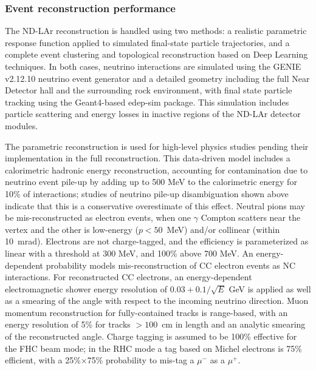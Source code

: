 \subsubsection{Event reconstruction performance}

The ND-LAr reconstruction is handled using two methods: a realistic parametric response function applied to simulated final-state particle trajectories, and a complete event clustering and topological reconstruction based on Deep Learning techniques. In both cases, neutrino interactions are simulated using the GENIE v2.12.10 neutrino event generator and a detailed geometry including the full Near Detector hall and the surrounding rock environment, with final state particle tracking using the Geant4-based edep-sim package. This simulation includes particle scattering and energy losses in inactive regions of the ND-LAr detector modules.

The parametric reconstruction is used for high-level physics studies pending their implementation in the full reconstruction. This data-driven model includes a calorimetric hadronic energy reconstruction, accounting for contamination due to neutrino event pile-up by adding up to 500 MeV to the calorimetric energy for 10\% of interactions; studies of neutrino pile-up disambiguation shown above indicate that this is a conservative overestimate of this effect. Neutral pions may be mis-reconstructed as electron events, when one $\gamma$ Compton scatters near the vertex and the other is low-energy ($p<50$~MeV) and/or collinear (within 10~mrad). Electrons are not charge-tagged, and the efficiency is parameterized as linear with a threshold at 300 MeV, and 100\% above 700 MeV. An energy-dependent probability models mis-reconstruction of CC electron events as NC interactions. For reconstructed CC electrons, an energy-dependent electromagnetic shower energy resolution of $0.03+0.1/\sqrt{E}$ GeV is applied as well as a smearing of the angle with respect to the incoming neutrino direction. Muon momentum reconstruction for fully-contained tracks is range-based, with an energy resolution of 5\% for tracks $>100$~cm in length and an analytic smearing of the reconstructed angle. Charge tagging is assumed to be 100\% effective for the FHC beam mode; in the RHC mode a tag based on Michel electrons is 75\% efficient, with a 25\%$\times$75\% probability to mis-tag a $\mu^-$ as a $\mu^+$.

